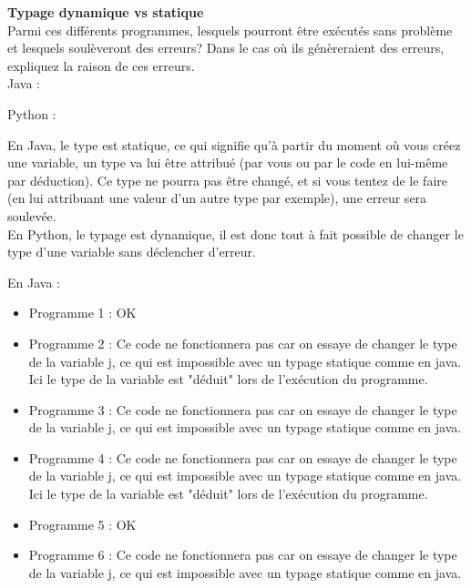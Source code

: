 \begin{Exercice}[5 minutes]  \textbf{Typage dynamique vs statique}\\
    
    Parmi ces différents programmes, lesquels pourront être exécutés sans problème et lesquels soulèveront des erreurs? Dans le cas où ils génèreraient des erreurs, expliquez la raison de ces erreurs.\\
    
    Java :
    
     
    
    Python :
    
     
    

    \begin{conseil}
    
        En Java, le type est statique, ce qui signifie qu'à partir du moment où vous créez une variable, un type va lui être attribué (par vous ou par le code en lui-même par déduction). Ce type ne pourra pas être changé, et si vous tentez de le faire (en lui attribuant une valeur d'un autre type par exemple), une erreur sera soulevée. \\

En Python, le typage est dynamique, il est donc tout à fait possible de changer le type d'une variable sans déclencher d'erreur. \\

    \end{conseil}
    \begin{solution}
        En Java : \\
        
        \begin{itemize}
        	\item Programme 1 : OK
        	\item Programme 2 : Ce code ne fonctionnera pas car on essaye de changer le type de la variable j, ce qui est impossible avec un typage statique comme en java. Ici le type de la variable est "déduit" lors de l'exécution du programme.
        	\item Programme 3 : Ce code ne fonctionnera pas car on essaye de changer le type de la variable j, ce qui est impossible avec un typage statique comme en java.
        	\item Programme 4 : Ce code ne fonctionnera pas car on essaye de changer le type de la variable j, ce qui est impossible avec un typage statique comme en java. Ici le type de la variable est "déduit" lors de l'exécution du programme.
        	\item Programme 5 : OK
        	\item Programme 6 : Ce code ne fonctionnera pas car on essaye de changer le type de la variable j, ce qui est impossible avec un typage statique comme en java. \\
        \end{itemize}
        

\end{solution}
\end{Exercice}
